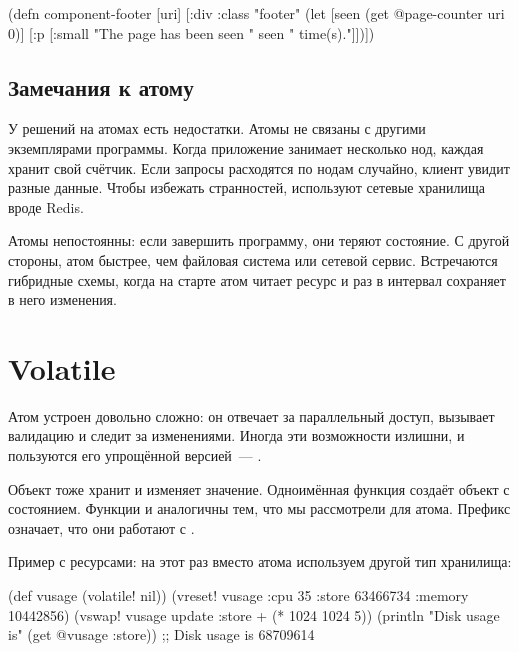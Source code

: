 \else

\begin{clojure}
(defn component-footer [uri]
  [:div {:class "footer"}
   (let [seen (get @page-counter uri 0)]
     [:p [:small "The page has been seen "
                 seen
                 " time(s)."]])])
\end{clojure}

\fi

\subsection{Замечания к атому}

У решений на атомах есть недостатки. Атомы не связаны с другими экземплярами
программы. Когда приложение занимает несколько нод, каждая хранит свой
счётчик. Если запросы расходятся по нодам случайно, клиент увидит разные
данные. Чтобы избежать странностей, используют сетевые хранилища вроде Redis.


Атомы непостоянны: если завершить программу, они теряют состояние. С другой
стороны, атом быстрее, чем файловая система или сетевой сервис. Встречаются
гибридные схемы, когда на старте атом читает ресурс и раз в интервал сохраняет в
него изменения.

\section{Volatile}

Атом устроен довольно сложно: он отвечает за параллельный доступ, вызывает
валидацию и следит за изменениями. Иногда эти возможности излишни, и пользуются
его упрощённой версией~--- .


Объект  тоже хранит и изменяет значение. Одноимённая функция
создаёт объект с состоянием. Функции  и 
аналогичны тем, что мы рассмотрели для атома. Префикс  означает, что
они работают с .

Пример с ресурсами: на этот раз вместо атома используем другой тип хранилища:

\ifnarrow

\begin{clojure}
(def vusage (volatile! nil))
(vreset! vusage
         {:cpu 35
          :store 63466734
          :memory 10442856})
(vswap! vusage
  update :store + (* 1024 1024 5))
(println
  "Disk usage is" (get @vusage :store))
;; Disk usage is 68709614
\end{clojure}

